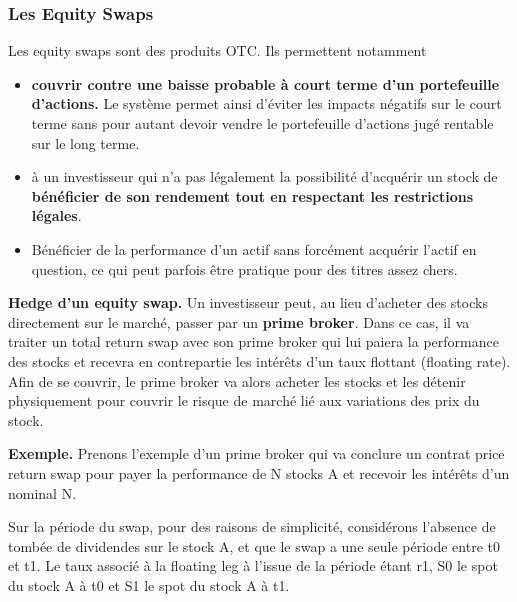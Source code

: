 \documentclass[a4paper]{article}
\begin{document}
\subsubsection{Les Equity Swaps}

Les equity swaps sont des produits OTC. Ils permettent notamment 
\begin{itemize}
    \item \textbf{couvrir contre une baisse probable à court terme d’un portefeuille d’actions.} Le système permet ainsi d’éviter les impacts négatifs sur le court terme sans pour autant devoir vendre le portefeuille d’actions jugé rentable sur le long terme.  
    
    \item à un investisseur qui n’a pas légalement la possibilité d’acquérir un stock de \textbf{bénéficier de son rendement tout en respectant les restrictions légales}.
    
    \item Bénéficier de la performance d’un actif sans forcément acquérir l’actif en question, ce qui peut parfois être pratique pour des titres assez chers.
\end{itemize} 
\textbf{Hedge d'un equity swap.} Un investisseur peut, au lieu d’acheter des stocks directement sur le marché, passer par un \textbf{prime broker}. Dans ce cas, il va traiter un total return swap avec son prime broker qui lui paiera la performance des stocks et recevra en contrepartie les intérêts d’un taux flottant (floating rate). Afin de se couvrir, le prime broker va alors acheter les stocks et les détenir physiquement pour couvrir le risque de marché lié aux variations des prix du stock. 

\vspace{2mm}

\textbf{Exemple.} 
Prenons l’exemple d’un prime broker qui va conclure un contrat price return swap pour payer la performance de N stocks A et recevoir les intérêts d’un nominal N.  

Sur la période du swap, pour des raisons de simplicité, considérons l’absence de tombée de dividendes sur le stock A, et que le swap a une seule période entre t0 et t1.  
Le taux associé à la floating leg à l’issue de la période étant r1, S0 le spot du stock A à t0 et S1 le spot du stock A à t1. 
\end{document}
